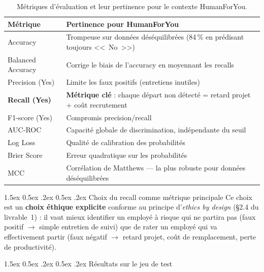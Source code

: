 \documentclass[12pt,a4paper]{article}
\makeatletter
\renewcommand\paragraph{\@startsection{paragraph}{4}{\z@}%
  {1.5ex \@plus 0.5ex \@minus .2ex}%
  {0.5ex \@plus .2ex}%
  {\normalfont\normalsize\bfseries}}
\makeatother
\begin{document}
\begin{table}[ht]
\centering
\begin{tabularx}{\textwidth}{lX}
\toprule
\textbf{Métrique} & \textbf{Pertinence pour HumanForYou} \\
\midrule
Accuracy & Trompeuse sur données déséquilibrées (84\,\% en prédisant toujours <<~No~>>) \\
Balanced Accuracy & Corrige le biais de l'accuracy en moyennant les recalls \\
Precision (Yes) & Limite les faux positifs (entretiens inutiles) \\
\textbf{Recall (Yes)} & \textbf{Métrique clé} : chaque départ non détecté = retard projet + coût recrutement \\
F1-score (Yes) & Compromis precision/recall \\
AUC-ROC & Capacité globale de discrimination, indépendante du seuil \\
Log Loss & Qualité de calibration des probabilités \\
Brier Score & Erreur quadratique sur les probabilités \\
MCC & Corrélation de Matthews --- la plus robuste pour données déséquilibrées \\
\bottomrule
\end{tabularx}
\caption{Métriques d'évaluation et leur pertinence pour le contexte HumanForYou.}
\end{table}

\paragraph{Choix du recall comme métrique principale} Ce choix est un \textbf{choix éthique explicite} conforme au principe d'\textit{ethics by design} (§2.4 du livrable~1) : il vaut mieux identifier un employé à risque qui ne partira pas (faux positif $\rightarrow$ simple entretien de suivi) que de rater un employé qui va effectivement partir (faux négatif $\rightarrow$ retard projet, coût de remplacement, perte de productivité).

\paragraph{Résultats sur le jeu de test}
\end{document}
